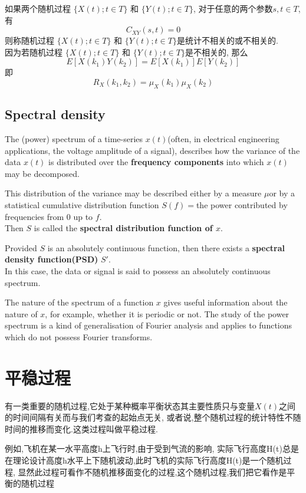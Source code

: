 \documentclass{article}
\begin{document}
如果两个随机过程 $\{X(t); t \in T\}$ 和 $\{Y(t); t \in T\}$,
对于任意的两个参数$s,t \in T$, 有 $$ C_{XY}(s,t) = 0 $$
则称随机过程 $\{X(t); t \in T\}$ 和 $\{Y(t); t \in T\}$是统计不相关的或不相关的.\\
因为若随机过程 $\{X(t); t \in T\}$ 和 $\{Y(t); t \in T\}$是不相关的, 那么
$$ E[X(k_1) Y(k_2)] = E[X(k_1)] E[Y(k_2)] $$
即
$$R_X(k_1, k_2) = \mu_X(k_1) \mu_X(k_2)$$

\subsection{Spectral density}
The (power) spectrum of a time-series $x(t)$(often, in electrical engineering applications, the voltage amplitude of a signal), 
describes how the variance of the data $x(t)$ is distributed over the \textbf{frequency components} into which $x(t)$ may be decomposed.

This distribution of the variance may be described either by a measure $\mu $or by a statistical cumulative distribution function 
$S(f)=$the power contributed by frequencies from $0$ up to $f$. \\
Then $S$ is called the \textbf{spectral distribution function of $x$}.

Provided $S$ is an absolutely continuous function, then there exists a \textbf{spectral density function(PSD)} $S'$. \\
In this case, the data or signal is said to possess an absolutely continuous spectrum. 

The nature of the spectrum of a function $x$ gives useful information about the nature of $x$, for example, whether it is periodic or not. 
The study of the power spectrum is a kind of generalisation of Fourier analysis and applies to functions which do not possess Fourier transforms.

\section{平稳过程}
有一类重要的随机过程,它处于某种概率平衡状态其主要性质只与变量$X(t)$之间的时间间隔有关而与我们考查的起始点无关, 
或者说,整个随机过程的统计特性不随时间的推移而变化.这类过程叫做平稳过程.

\begin{example}
例如,飞机在某一水平高度h上飞行时,由于受到气流的影响,
实际飞行高度H(t)总是在理论设计高度h水平上下随机波动,此时飞机的实际飞行高度H(t)是一个随机过程,
显然此过程可看作不随机推移面变化的过程,这个随机过程,我们把它看作是平衡的随机过程
\end{example}
\end{document}
